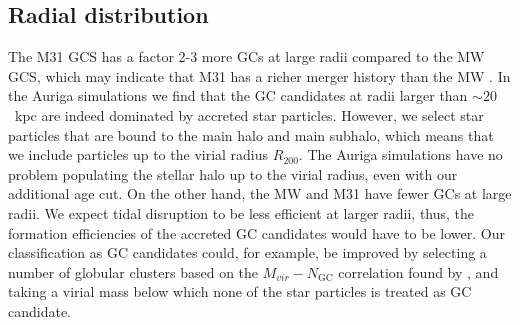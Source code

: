 \documentclass[a4paper,fleqn,usenatbib]{mnras}
\newcommand{\Sun}[0]{\ensuremath{_{\odot}}}
\providecommand{\DIFadd}[1]{{\protect\color{blue}\uwave{#1}}} %
\providecommand{\DIFdel}[1]{{\protect\color{red}\sout{#1}}}                      %
\providecommand{\DIFaddbegin}{} %
\providecommand{\DIFaddend}{} %
\providecommand{\DIFdelbegin}{} %
\providecommand{\DIFdelend}{} %
\newcommand{\DIFscaledelfig}{0.5}
\newlength{\DIFdelgraphicswidth} %
\newlength{\DIFdelgraphicsheight} %
\newcommand{\DIFaddincludegraphics}[2][]{{\color{blue}\fbox{\DIFOincludegraphics[#1]{#2}}}} %
\newcommand{\DIFdelincludegraphics}[2][]{%
\sbox{\DIFdelgraphicsbox}{\DIFOincludegraphics[#1]{#2}}%
\settoboxwidth{\DIFdelgraphicswidth}{\DIFdelgraphicsbox} %
\settoboxtotalheight{\DIFdelgraphicsheight}{\DIFdelgraphicsbox} %
\scalebox{\DIFscaledelfig}{%
\parbox[b]{\DIFdelgraphicswidth}{\usebox{\DIFdelgraphicsbox}\\[-\baselineskip] \rule{\DIFdelgraphicswidth}{0em}}\llap{\resizebox{\DIFdelgraphicswidth}{\DIFdelgraphicsheight}{%
\setlength{\unitlength}{\DIFdelgraphicswidth}%
\begin{picture}(1,1)%
\thicklines\linethickness{2pt} %
{\color[rgb]{1,0,0}\put(0,0){\framebox(1,1){}}}%
{\color[rgb]{1,0,0}\put(0,0){\line( 1,1){1}}}%
{\color[rgb]{1,0,0}\put(0,1){\line(1,-1){1}}}%
\end{picture}%
}\hspace*{3pt}}} %
} %
\DeclareRobustCommand{\DIFaddbegin}{\DIFOaddbegin \let\includegraphics\DIFaddincludegraphics} %
\DeclareRobustCommand{\DIFaddend}{\DIFOaddend \let\includegraphics\DIFOincludegraphics} %
\DeclareRobustCommand{\DIFdelbegin}{\DIFOdelbegin \let\includegraphics\DIFdelincludegraphics} %
\DeclareRobustCommand{\DIFdelend}{\DIFOaddend \let\includegraphics\DIFOincludegraphics} %
\begin{document}
\subsection{Radial distribution}
\label{sec:discussion_Rgc}
The M31 GCS has a factor 2-3 more GCs at large radii compared to the MW GCS,
which may indicate that M31 has a richer merger history than the MW 
\citep{2016ApJ...824...42C}. In the Auriga simulations we find that the GC 
candidates at radii larger than ${\sim}20$~kpc are indeed dominated by accreted
star particles. However, we select star particles that are bound to the main 
halo and main subhalo, which means that we include particles up to the virial 
radius $R_{200}$. The Auriga simulations have no problem populating the stellar 
halo up to the virial radius, even with our additional age cut. On the other hand, 
the MW and M31 have fewer GCs at large radii. We expect tidal disruption to be
less efficient at larger radii, thus, the formation efficiencies of the accreted 
GC candidates would have to be lower. Our classification as GC candidates could, 
for example, be improved by selecting a number of globular clusters based on the 
\DIFdelbegin \DIFdel{$M_{vir}-N_{\text{GC}}$ }\DIFdelend \DIFaddbegin \DIFadd{$M_{vir}-N_{\text{gal}}$ }\DIFaddend correlation found by \citet{2019arXiv190100900B}, and 
taking a virial mass below which none of the star particles is treated as GC candidate.

\end{document}
